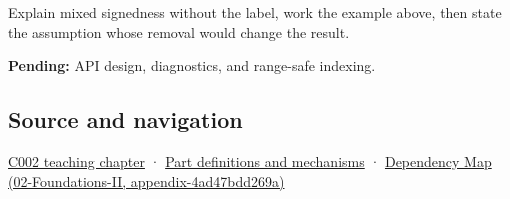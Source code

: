 Explain mixed signedness without the label, work the example above, then state the assumption whose removal would change the result.

\textbf{Pending:} API design, diagnostics, and range-safe indexing.

\subsection{Source and navigation}\label{appendix-736a2345de4a-source-and-navigation}

\hyperref[01-foundations-i-ch001-arithmetic-becomes-a-policy]{C002 teaching chapter} · \hyperref[appendix-fd090d982a15]{Part definitions and mechanisms} · \href{../02-Foundations-II/main.pdf\#nameddest=appendix-4ad47bdd269a}{Dependency Map (02-Foundations-II, appendix-4ad47bdd269a)}
